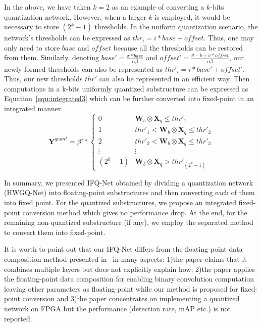 \documentclass[10pt,twocolumn,letterpaper]{article}
\begin{document}
In the above, we have taken $k=2$ as an example of converting a $k$-bits quantization network. However, when a larger $k$ is employed, it would be necessary to store $(2^k-1)$ thresholds. In the uniform quantization scenario, the network's thresholds can be expressed as $thr_i=i*base + offset$. Thus, one may only need to store $base$ and $offset$ because all the thresholds can be restored from them. Similarly, denoting $base{'}=\frac{\sigma*base}{\alpha\beta}$ and $offset{'}=\frac{\theta - b + \sigma*offset}{\alpha\beta}$, our newly formed thresholds can also be represented as $thr{'}_i=i*base{'} + offset{'}$. Thus, our new thresholds $thr{'}$ can also be represented in an efficient way.  Then computations in a k-bits uniformly quantized substructure can be expressed as Equation~\ref{equ:integrated3} which can be further converted into fixed-point in an integrated manner.
\begin{equation}\label{equ:integrated3}
\textbf{Y}^{quant}= \beta{'}*\left\{
\begin{array}{cc}
0         &{                                          \textbf{W}_b\otimes \textbf{X}_q \leq  thr{'}_{1}} \\
1      &{thr{'}_{1}            <  \textbf{W}_b\otimes \textbf{X}_q  \leq  thr{'}_{2}} \\
2     &{thr{'}_{2} <  \textbf{W}_b\otimes \textbf{X}_q  \leq  thr{'}_{3}} \\
\vdots     &   \vdots  \\
(2^k-1)     &{                                          \textbf{W}_b\otimes \textbf{X}_q > thr{'}_{(2^k-1)}}
\end{array}
\right.
\end{equation}

In summary, we presented IFQ-Net obtained by dividing a quantization network (\eg HWGQ-Net) into floating-point substructures and then converting each of them into fixed point. For the quantized substructures, we propose an integrated fixed-point conversion method which gives no performance drop. At the end, for the remaining non-quantized substructure (if any), we employ the separated method to convert them into fixed-point.



It is worth to point out that our IFQ-Net differs from the floating-point data composition method presented in~\cite{LayerMerge} in many aspects: 1)the paper claims that it combines multiple layers but does not explicitly explain how; 2)the paper applies the floating-point data composition for enabling binary convolution computation leaving other parameters as floating-point while our method is proposed for fixed-point conversion and 3)the paper concentrates on implementing a quantized network on FPGA but the performance (\eg detection rate, mAP etc.) is not reported.
\end{document}
